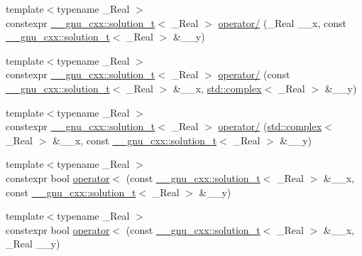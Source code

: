 \begin{DoxyCompactItemize}
\item 
{\footnotesize template$<$typename \+\_\+\+Real $>$ }\\constexpr \hyperlink{namespace____gnu__cxx_ae20ea642de50eb361074c62676b0159c}{\+\_\+\+\_\+gnu\+\_\+cxx\+::solution\+\_\+t}$<$ \+\_\+\+Real $>$ \hyperlink{namespacestd_a28e6ddaee7c29b09e84e85d2b52f5bc1}{operator/} (\+\_\+\+Real \+\_\+\+\_\+x, const \hyperlink{namespace____gnu__cxx_ae20ea642de50eb361074c62676b0159c}{\+\_\+\+\_\+gnu\+\_\+cxx\+::solution\+\_\+t}$<$ \+\_\+\+Real $>$ \&\+\_\+\+\_\+y)
\item 
{\footnotesize template$<$typename \+\_\+\+Real $>$ }\\constexpr \hyperlink{namespace____gnu__cxx_ae20ea642de50eb361074c62676b0159c}{\+\_\+\+\_\+gnu\+\_\+cxx\+::solution\+\_\+t}$<$ \+\_\+\+Real $>$ \hyperlink{namespacestd_a59403102f8805c3846c7fbf820e7b48a}{operator/} (const \hyperlink{namespace____gnu__cxx_ae20ea642de50eb361074c62676b0159c}{\+\_\+\+\_\+gnu\+\_\+cxx\+::solution\+\_\+t}$<$ \+\_\+\+Real $>$ \&\+\_\+\+\_\+x, \hyperlink{classstd_1_1complex}{std\+::complex}$<$ \+\_\+\+Real $>$ \&\+\_\+\+\_\+y)
\item 
{\footnotesize template$<$typename \+\_\+\+Real $>$ }\\constexpr \hyperlink{namespace____gnu__cxx_ae20ea642de50eb361074c62676b0159c}{\+\_\+\+\_\+gnu\+\_\+cxx\+::solution\+\_\+t}$<$ \+\_\+\+Real $>$ \hyperlink{namespacestd_a51cf4f07903a8d424249d8198c73843d}{operator/} (\hyperlink{classstd_1_1complex}{std\+::complex}$<$ \+\_\+\+Real $>$ \&\+\_\+\+\_\+x, const \hyperlink{namespace____gnu__cxx_ae20ea642de50eb361074c62676b0159c}{\+\_\+\+\_\+gnu\+\_\+cxx\+::solution\+\_\+t}$<$ \+\_\+\+Real $>$ \&\+\_\+\+\_\+y)
\item 
{\footnotesize template$<$typename \+\_\+\+Real $>$ }\\constexpr bool \hyperlink{namespacestd_a85cfd5c1970e0d79e11521e9af3b4011}{operator$<$} (const \hyperlink{namespace____gnu__cxx_ae20ea642de50eb361074c62676b0159c}{\+\_\+\+\_\+gnu\+\_\+cxx\+::solution\+\_\+t}$<$ \+\_\+\+Real $>$ \&\+\_\+\+\_\+x, const \hyperlink{namespace____gnu__cxx_ae20ea642de50eb361074c62676b0159c}{\+\_\+\+\_\+gnu\+\_\+cxx\+::solution\+\_\+t}$<$ \+\_\+\+Real $>$ \&\+\_\+\+\_\+y)
\item 
{\footnotesize template$<$typename \+\_\+\+Real $>$ }\\constexpr bool \hyperlink{namespacestd_a749f896a40896157206f192de6dea285}{operator$<$} (const \hyperlink{namespace____gnu__cxx_ae20ea642de50eb361074c62676b0159c}{\+\_\+\+\_\+gnu\+\_\+cxx\+::solution\+\_\+t}$<$ \+\_\+\+Real $>$ \&\+\_\+\+\_\+x, \+\_\+\+Real \+\_\+\+\_\+y)

\end{DoxyCompactItemize}
